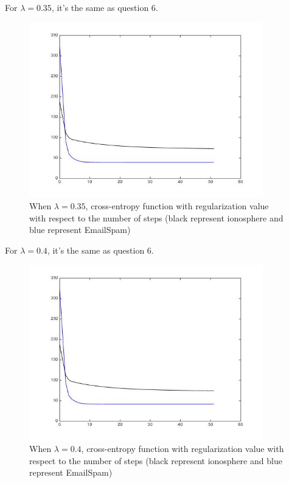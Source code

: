 \documentclass[11pt]{article}
\numberwithin{equation}{section}
\begin{document}
	For $\lambda = 0.35$, it's the same as question 6.
	\begin{figure} [H]
    	\centering 
    	\includegraphics[width=4in]{Q7035} 
    	\caption{When $\lambda = 0.35$, cross-entropy function with regularization value with respect to the number of steps (black represent ionosphere and blue represent EmailSpam)} 
    	\label{fig:side:a} 
	\end{figure}
	
	For $\lambda = 0.4$, it's the same as question 6.
	\begin{figure} [H]
    	\centering 
    	\includegraphics[width=4in]{Q704} 
    	\caption{When $\lambda = 0.4$, cross-entropy function with regularization value with respect to the number of steps (black represent ionosphere and blue represent EmailSpam)} 
    	\label{fig:side:a} 
	\end{figure}
	
\end{document}
